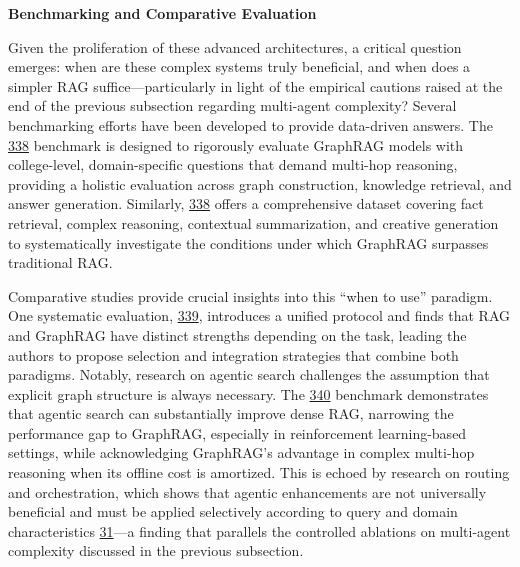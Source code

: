 \documentclass[11pt]{article}
\begin{document}
\textbf{Benchmarking and Comparative Evaluation}

Given the proliferation of these advanced architectures, a critical question emerges: when are these complex systems truly beneficial, and when does a simpler RAG suffice---particularly in light of the empirical cautions raised at the end of the previous subsection regarding multi-agent complexity? Several benchmarking efforts have been developed to provide data-driven answers. The \href{GraphRAG-Bench\%20Challenging\%20Domain-Specific\%20Reasoning\%20for\%20Evaluating\%20Graph\%20Retrieval-Augmented\%20Generation}{338} benchmark is designed to rigorously evaluate GraphRAG models with college-level, domain-specific questions that demand multi-hop reasoning, providing a holistic evaluation across graph construction, knowledge retrieval, and answer generation. Similarly, \href{When\%20to\%20use\%20Graphs\%20in\%20RAG\%20A\%20Comprehensive\%20Analysis\%20for\%20Graph\%20Retrieval-Augmented\%20Generation}{338} offers a comprehensive dataset covering fact retrieval, complex reasoning, contextual summarization, and creative generation to systematically investigate the conditions under which GraphRAG surpasses traditional RAG.

Comparative studies provide crucial insights into this ``when to use'' paradigm. One systematic evaluation, \href{RAG\%20vs.\%20GraphRAG\%20A\%20Systematic\%20Evaluation\%20and\%20Key\%20Insights}{339}, introduces a unified protocol and finds that RAG and GraphRAG have distinct strengths depending on the task, leading the authors to propose selection and integration strategies that combine both paradigms. Notably, research on agentic search challenges the assumption that explicit graph structure is always necessary. The \href{Do\%20We\%20Still\%20Need\%20GraphRAG\%20Benchmarking\%20RAG\%20and\%20GraphRAG\%20for\%20Agentic\%20Search\%20Systems}{340} benchmark demonstrates that agentic search can substantially improve dense RAG, narrowing the performance gap to GraphRAG, especially in reinforcement learning-based settings, while acknowledging GraphRAG's advantage in complex multi-hop reasoning when its offline cost is amortized. This is echoed by research on routing and orchestration, which shows that agentic enhancements are not universally beneficial and must be applied selectively according to query and domain characteristics \href{Agent-Orchestrated\%20Adaptive\%20RAG\%20A\%20Comparative\%20Study\%20on\%20Structured\%20and\%20Multi-Hop\%20Retrieval}{31}---a finding that parallels the controlled ablations on multi-agent complexity discussed in the previous subsection.
\end{document}
